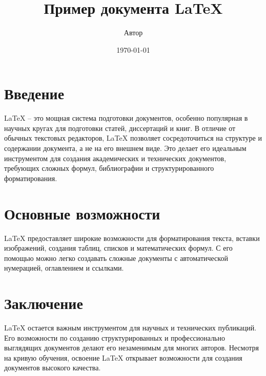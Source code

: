 \documentclass{article}
\title{Пример документа LaTeX}
\author{Автор}
\date{\today}
\begin{document}
\maketitle

\section{Введение}
LaTeX -- это мощная система подготовки документов, особенно популярная в научных кругах для подготовки статей, диссертаций и книг. В отличие от обычных текстовых редакторов, LaTeX позволяет сосредоточиться на структуре и содержании документа, а не на его внешнем виде. Это делает его идеальным инструментом для создания академических и технических документов, требующих сложных формул, библиографии и структурированного форматирования.

\section{Основные возможности}
LaTeX предоставляет широкие возможности для форматирования текста, вставки изображений, создания таблиц, списков и математических формул. С его помощью можно легко создавать сложные документы с автоматической нумерацией, оглавлением и ссылками.

\section{Заключение}
LaTeX остается важным инструментом для научных и технических публикаций. Его возможности по созданию структурированных и профессионально выглядящих документов делают его незаменимым для многих авторов. Несмотря на кривую обучения, освоение LaTeX открывает возможности для создания документов высокого качества.
\end{document}
